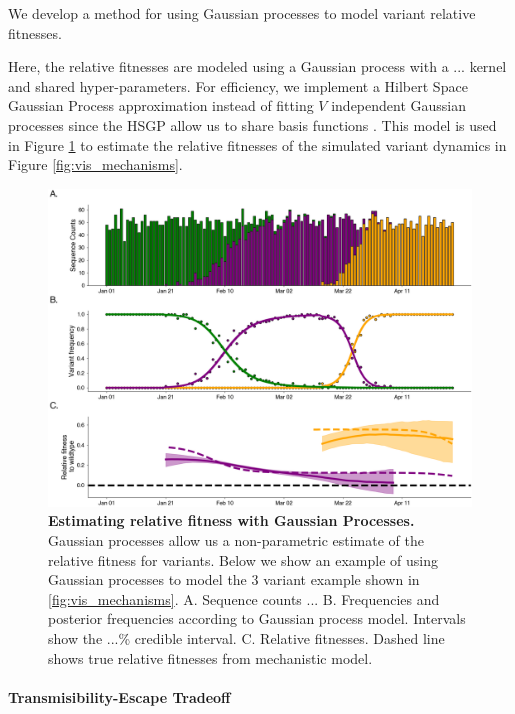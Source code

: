 \documentclass[12pt,oneside,letterpaper]{article}
\begin{document}
We develop a method for using Gaussian processes to model variant relative fitnesses.


Here, the relative fitnesses are modeled using a Gaussian process with a ... kernel and shared hyper-parameters.
For efficiency, we implement a Hilbert Space Gaussian Process approximation instead of fitting $V$ independent Gaussian processes since the HSGP allow us to share basis functions \cite{riutortmayol2022practical}.
This model is used in Figure \ref{fig:gp_example} to estimate the relative fitnesses of the simulated variant dynamics in Figure \ref{fig:vis_mechanisms}.

\begin{figure}[h]
    \centering
    \includegraphics[width=0.8\linewidth]{./figures/gp_example.png}
    \caption{\textbf{Estimating relative fitness with Gaussian Processes.} 
    Gaussian processes allow us a non-parametric estimate of the relative fitness for variants. 
    Below we show an example of using Gaussian processes to model the 3 variant example shown in \ref{fig:vis_mechanisms}.
    A. Sequence counts ...
    B. Frequencies and posterior frequencies according to Gaussian process model. Intervals show the ...\% credible interval.
    C. Relative fitnesses. Dashed line shows true relative fitnesses from mechanistic model. 
}
    \label{fig:gp_example}
\end{figure}


\paragraph{Transmisibility-Escape Tradeoff}%
\end{document}
